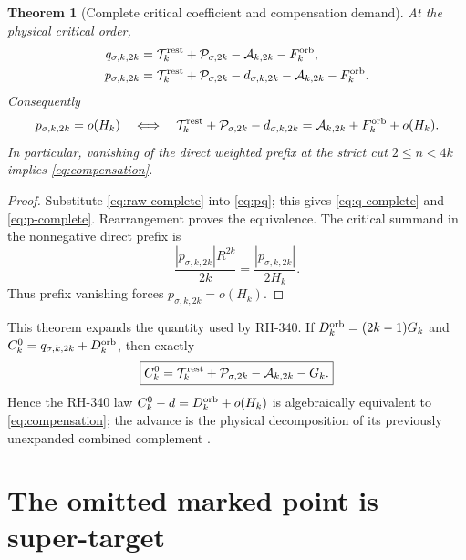 \documentclass[11pt]{article}
\newtheorem{theorem}{Theorem}[section]
\theoremstyle{remark}
\newcommand{\cP}{\mathcal P}
\newcommand{\cA}{\mathcal A}
\newcommand{\cT}{\mathcal T}
\begin{document}
\begin{theorem}[Complete critical coefficient and compensation demand]
\label{thm:critical}
At the physical critical order,
\begin{align}
 q_{\sigma,k,2k}
 &=\cT_k^{\rm rest}+\cP_{\sigma,2k}
   -\cA_{k,2k}-F_k^{\rm orb},\label{eq:q-complete}\\
 p_{\sigma,k,2k}
 &=\cT_k^{\rm rest}+\cP_{\sigma,2k}-d_{\sigma,k,2k}
   -\cA_{k,2k}-F_k^{\rm orb}.
 \label{eq:p-complete}
\end{align}
Consequently
\begin{equation}\label{eq:compensation}
 p_{\sigma,k,2k}=o(H_k)
 \quad\Longleftrightarrow\quad
 \cT_k^{\rm rest}+\cP_{\sigma,2k}-d_{\sigma,k,2k}
 =\cA_{k,2k}+F_k^{\rm orb}+o(H_k).
\end{equation}
In particular, vanishing of the direct weighted prefix at the strict cut
$2\le n<4k$ implies \eqref{eq:compensation}.
\end{theorem}

\begin{proof}
Substitute \eqref{eq:raw-complete} into \eqref{eq:pq}; this gives
\eqref{eq:q-complete} and \eqref{eq:p-complete}.  Rearrangement proves the
equivalence.  The critical summand in the nonnegative direct prefix is
\[
 \frac{|p_{\sigma,k,2k}|R^{2k}}{2k}
 =\frac{|p_{\sigma,k,2k}|}{2H_k}.
\]
Thus prefix vanishing forces $p_{\sigma,k,2k}=o(H_k)$.
\end{proof}

This theorem expands the quantity used by RH-340.  If
$D_k^{\rm orb}=(2k-1)G_k$ and
$C_k^0=q_{\sigma,k,2k}+D_k^{\rm orb}$, then exactly
\begin{equation}\label{eq:C0}
 \boxed{C_k^0=\cT_k^{\rm rest}+\cP_{\sigma,2k}
 -\cA_{k,2k}-G_k.}
\end{equation}
Hence the RH-340 law $C_k^0-d=D_k^{\rm orb}+o(H_k)$ is algebraically
equivalent to \eqref{eq:compensation}; the advance is the physical
decomposition of its previously unexpanded combined complement
\citep{WangSynchronizedPrefix2026}.

\section{The omitted marked point is super-target}
\end{document}
